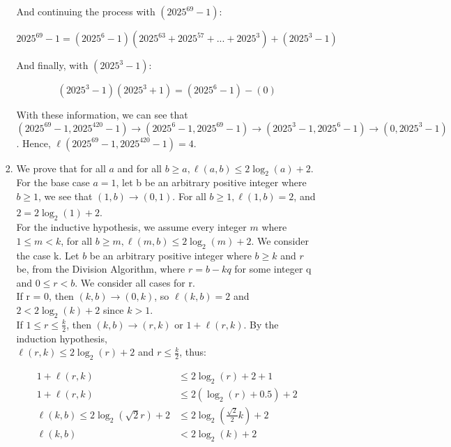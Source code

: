 \documentclass{article}
\begin{document}
\begin{enumerate}[leftmargin=*, label=\arabic*.]
\begin{enumerate}[label=\alph*)]
\begin{enumerate}[label=\alph*)]
        And continuing the process with $(2025^{69} - 1)$: 

        $$2025^{69} - 1 = (2025^{6} - 1)(2025^{63} + 2025^{57} + ... + 2025^3) + (2025^{3} - 1)$$

        And finally, with $(2025^{3} - 1)$:
        
        $$(2025^{3} - 1)(2025^{3}+1) = (2025^{6} - 1) - (0)$$
         
        With these information, we can see that $(2025^{69} - 1, 2025^{420} - 1) \xrightarrow{} (2025^{6} - 1, 2025^{69} - 1) \xrightarrow{} (2025^{3} - 1, 2025^{6} - 1) \xrightarrow{} (0, 2025^{3} - 1)$. Hence, $\ell(2025^{69} - 1, 2025^{420} - 1) = 4$. \\

        \item
        We prove that for all $a$ and for all $b \geq a , \ell(a, b) \leq 2\log_2(a)+2$. For the base case $a = 1$, let b be an arbitrary positive integer where $b \geq 1$, we see that $(1, b) \xrightarrow[]{} (0, 1)$. For all $b \geq 1, \ell(1, b) = 2$, and $2 = 2\log_2(1) + 2$.\\

        For the inductive hypothesis, we assume every integer $m$ where $1 \leq m < k$, for all $b \geq m,  \ell(m, b) \leq  2\log_2(m) + 2$. We consider the case k. Let $b$ be an arbitrary positive integer where $b \geq k$ and $r$ be, from the Division Algorithm, where $r = b - kq$ for some integer q and $0 \leq r < b$. We consider all cases for r. \\

        If r = 0, then $(k, b) \xrightarrow{} (0, k)$, so $\ell(k, b) = 2$ and $2 < 2\log_2(k) + 2$ since $ k > 1$. \\
        
        If $1 \leq r \leq \frac{k}{2}$, then $(k, b) \xrightarrow{} (r, k)$ or $1 + \ell(r, k)$. By the induction hypothesis, \\$\ell(r, k) \leq 2\log_2(r) + 2$ and $r \leq \frac{k}{2}$, thus: 

            \begin{align*}
              1 + \ell(r, k) &\leq 2\log_2(r) + 2 + 1 \\  
              1 + \ell(r, k) &\leq 2(\log_2(r) + 0.5) + 2 \\
              \ell(k, b) \leq 2\log_2(\sqrt{2}r) + 2 &\leq 2 \log_2(\frac{\sqrt{2}}{2}k) + 2 \\
              \ell(k, b) &< 2\log_2(k) + 2 \\
        \end{align*}
      

\end{enumerate}
\end{enumerate}
\end{enumerate}
\end{document}
